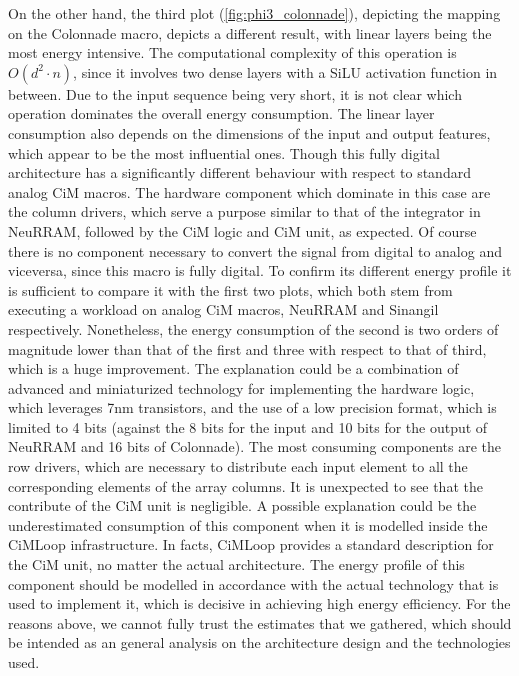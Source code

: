 \documentclass[conference]{IEEEtran}
\begin{document}
On the other hand, the third plot (\ref{fig:phi3_colonnade}), depicting the mapping on the Colonnade macro, depicts a different result, with linear layers being the most energy intensive. The computational complexity of this operation is $O(d^2 \cdot n)$, since it involves two dense layers with a SiLU activation function in between. Due to the input sequence being very short, it is not clear which operation dominates the overall energy consumption. The linear layer consumption also depends on the dimensions of the input and output features, which appear to be the most influential ones. Though this fully digital architecture has a significantly different behaviour with respect to standard analog CiM macros. The hardware component which dominate in this case are the column drivers, which serve a purpose similar to that of the integrator in NeuRRAM, followed by the CiM logic and CiM unit, as expected. Of course there is no component necessary to convert the signal from digital to analog and viceversa, since this macro is fully digital. To confirm its different energy profile it is sufficient to compare it with the first two plots, which both stem from executing a workload on analog CiM macros, NeuRRAM and Sinangil respectively. Nonetheless, the energy consumption of the second is two orders of magnitude lower than that of the first and three with respect to that of third, which is a huge improvement. The explanation could be a combination of advanced and miniaturized technology for implementing the hardware logic, which leverages 7nm transistors, and the use of a low precision format, which is limited to 4 bits (against the 8 bits for the input and 10 bits for the output of NeuRRAM and 16 bits of Colonnade).
The most consuming components are the row drivers, which are necessary to distribute each input element to all the corresponding elements of the array columns. It is unexpected to see that the contribute of the CiM unit is negligible. A possible explanation could be the underestimated consumption of this component when it is modelled inside the CiMLoop infrastructure.  In facts, CiMLoop provides a standard description for the CiM unit, no matter the actual architecture. The energy profile of this component should be modelled in accordance with the actual technology that is used to implement it, which is decisive in achieving high energy efficiency. For the reasons above, we cannot fully trust the estimates that we gathered, which should be intended as an general analysis on the architecture design and the technologies used.  
\end{document}
